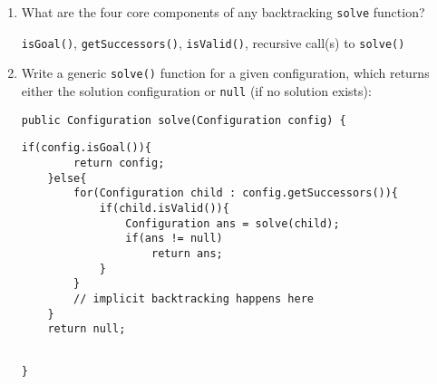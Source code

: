 \begin{enumerate}
\item What are the four core components of any backtracking \texttt{solve} function?

\begin{answer}
\texttt{isGoal()}, \texttt{getSuccessors()}, \texttt{isValid()}, recursive call(s) to \texttt{solve()}
\end{answer}

\item Write a generic \texttt{solve()} function for a given configuration, which returns either the solution configuration or \texttt{null} (if no solution exists):
\vspace{.25in}
\begin{lstlisting}[numbers=none]
public Configuration solve(Configuration config) {
\end{lstlisting}
\begin{answer}
\begin{lstlisting}[numbers=none]
	if(config.isGoal()){
		return config;
	}else{
		for(Configuration child : config.getSuccessors()){
			if(child.isValid()){
				Configuration ans = solve(child);
				if(ans != null)
					return ans;
			}
		}
		// implicit backtracking happens here
	}
	return null;
	
\end{lstlisting}
\end{answer}
\begin{lstlisting}[numbers=none]
}
\end{lstlisting}
\end{enumerate}